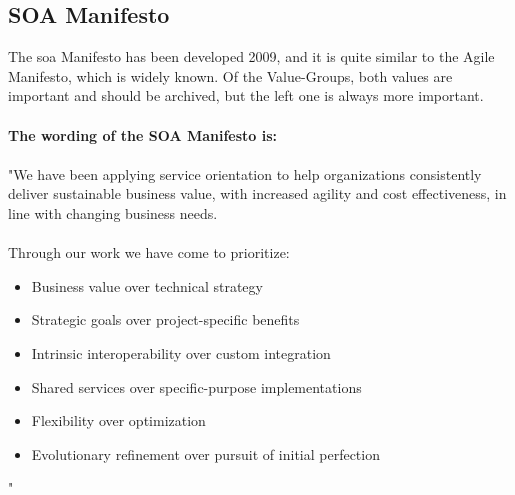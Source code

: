 \documentclass[12pt]{article}
\begin{document}
\subsection{SOA Manifesto}
The \gls{soa} Manifesto has been developed 2009, and it is quite similar to the Agile Manifesto, which is widely known. Of the Value-Groups, both values are important and should be archived, but the left one is always more important. \\ \\
\textbf{The wording of the SOA Manifesto is:}\\ \\ 
"We have been applying service orientation to help organizations 
consistently deliver sustainable business value, with increased agility
and cost effectiveness, in line with changing business needs. \\ \\
Through our work we have come to prioritize: \\
\begin{itemize}
\item Business value over technical strategy 
\item Strategic goals over project-specific benefits 
\item Intrinsic interoperability over custom integration 
\item Shared services over specific-purpose implementations 
\item Flexibility over optimization
\item Evolutionary refinement over pursuit of initial perfection
\end{itemize}"\cite{soamaifesto}
\end{document}
